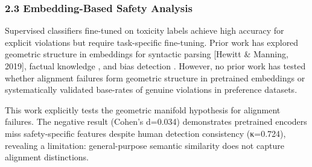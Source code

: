 \subsubsection{2.3 Embedding-Based Safety Analysis}

Supervised classifiers fine-tuned on toxicity labels achieve high accuracy for explicit violations but require task-specific fine-tuning. Prior work has explored geometric structure in embeddings for syntactic parsing [Hewitt \& Manning, 2019], factual knowledge \citep{Petronietal2019}, and bias detection \citep{Bolukbasietal2016}. However, no prior work has tested whether alignment failures form geometric structure in pretrained embeddings or systematically validated base-rates of genuine violations in preference datasets.

This work explicitly tests the geometric manifold hypothesis for alignment failures. The negative result (Cohen's d=0.034) demonstrates pretrained encoders miss safety-specific features despite human detection consistency (κ=0.724), revealing a limitation: general-purpose semantic similarity does not capture alignment distinctions.
